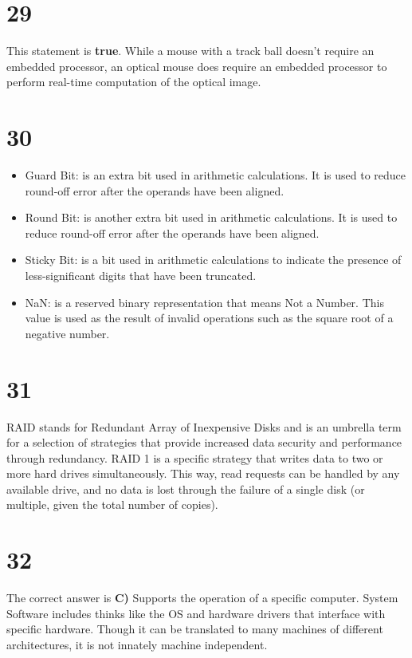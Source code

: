 \documentclass[a4paper,11pt]{article}
\begin{document}

\section*{29}
This statement is {\bf true}.  While a mouse with a track ball doesn't require an embedded processor, an optical mouse does require an embedded processor to perform real-time computation of the optical image. 


\section*{30}
\begin{itemize}
  \item Guard Bit:  is an extra bit used in arithmetic calculations. It is used to reduce round-off error after the operands have been aligned.
  \item Round Bit: is another extra bit used in arithmetic calculations.   It is used to reduce round-off error after the operands have been aligned.
  \item Sticky Bit: is a bit used in arithmetic calculations to indicate the presence of less-significant digits that have been truncated.  
  \item NaN: is a reserved binary representation that means Not a Number.  This value is used as the result of invalid operations such as the square root of a negative number.
\end{itemize}


\section*{31}
RAID stands for Redundant Array of Inexpensive Disks and is an umbrella term for a selection of strategies that provide increased data security and performance through redundancy.  RAID 1 is a specific strategy that writes data to two or more hard drives simultaneously.  This way, read requests can be handled by any available drive, and no data is lost through the failure of a single disk (or multiple, given the total number of copies).
 

\section*{32}
The correct answer is {\bf C)} Supports the operation of a specific computer.  System Software includes thinks like the OS and hardware drivers that interface with specific hardware.  Though it can be translated to many machines of different architectures, it is not innately machine independent.  
\end{document}
